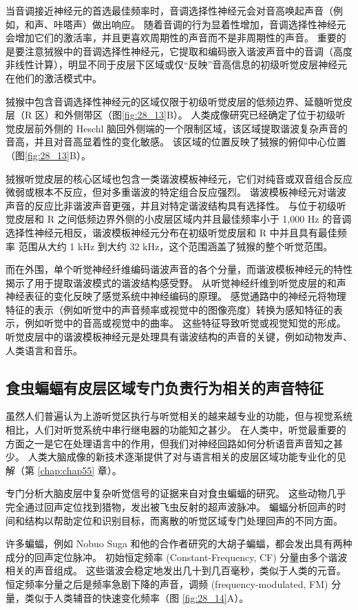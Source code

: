 当音调接近神经元的首选最佳频率时，音调选择性神经元会对音高唤起声音（例如，和声、咔嗒声）做出响应。 
随着音调的行为显着性增加，音调选择性神经元会增加它们的激活率，并且更喜欢周期性的声音而不是非周期性的声音。 
重要的是要注意狨猴中的音调选择性神经元，它提取和编码嵌入谐波声音中的音调（高度非线性计算），明显不同于皮层下区域或仅“反映”音高信息的初级听觉皮层神经元 在他们的激活模式中。

狨猴中包含音调选择性神经元的区域仅限于初级听觉皮层的低频边界、延髓听觉皮层（R 区）和外侧带区（图\ref{fig:28_13}B）。 
人类成像研究已经确定了位于初级听觉皮层前外侧的 Heschl 脑回外侧端的一个限制区域，该区域提取谐波复杂声音的音高，并且对音高显着性的变化敏感。 
该区域的位置反映了狨猴的俯仰中心位置（图\ref{fig:28_13}B）。


狨猴听觉皮层的核心区域也包含一类谐波模板神经元，它们对纯音或双音组合反应微弱或根本不反应，但对多重谐波的特定组合反应强烈。 
谐波模板神经元对谐波声音的反应比非谐波声音更强，并且对特定谐波结构具有选择性。 
与位于初级听觉皮层和 R 之间低频边界外侧的小皮层区域内并且最佳频率小于 1,000 Hz 的音调选择性神经元相反，谐波模板神经元分布在初级听觉皮层和 R 中并且具有最佳频率 范围从大约 1 kHz 到大约 32 kHz，这个范围涵盖了狨猴的整个听觉范围。


而在外围，单个听觉神经纤维编码谐波声音的各个分量，而谐波模板神经元的特性揭示了用于提取谐波模式的谐波结构感受野。 
从听觉神经纤维到听觉皮层的和声神经表征的变化反映了感觉系统中神经编码的原理。 
感觉通路中的神经元将物理特征的表示（例如听觉中的声音频率或视觉中的图像亮度）转换为感知特征的表示，例如听觉中的音高或视觉中的曲率。 
这些特征导致听觉或视觉知觉的形成。 
听觉皮层中的谐波模板神经元是处理具有谐波结构的声音的关键，例如动物发声、人类语言和音乐。


\subsection{食虫蝙蝠有皮层区域专门负责行为相关的声音特征}
虽然人们普遍认为上游听觉区执行与听觉相关的越来越专业的功能，但与视觉系统相比，人们对听觉系统中串行继电器的功能知之甚少。 
在人类中，听觉最重要的方面之一是它在处理语言中的作用，但我们对神经回路如何分析语音声音知之甚少。 
人类大脑成像的新技术逐渐提供了对与语言相关的皮层区域功能专业化的见解（第 \ref{chap:chap55} 章）。


专门分析大脑皮层中复杂听觉信号的证据来自对食虫蝙蝠的研究。 
这些动物几乎完全通过回声定位找到猎物，发出被飞虫反射的超声波脉冲。 
蝙蝠分析回声的时间和结构以帮助定位和识别目标，而离散的听觉区域专门处理回声的不同方面。


许多蝙蝠，例如 Nobuo Suga 和他的合作者研究的大胡子蝙蝠，都会发出具有两种成分的回声定位脉冲。 
初始恒定频率 (Constant-Frequency, CF) 分量由多个谐波相关的声音组成。 
这些谐波会稳定地发出几十到几百毫秒，类似于人类的元音。 
恒定频率分量之后是频率急剧下降的声音，调频 (frequency-modulated, FM) 分量，类似于人类辅音的快速变化频率（图 \ref{fig:28_14}A）。

